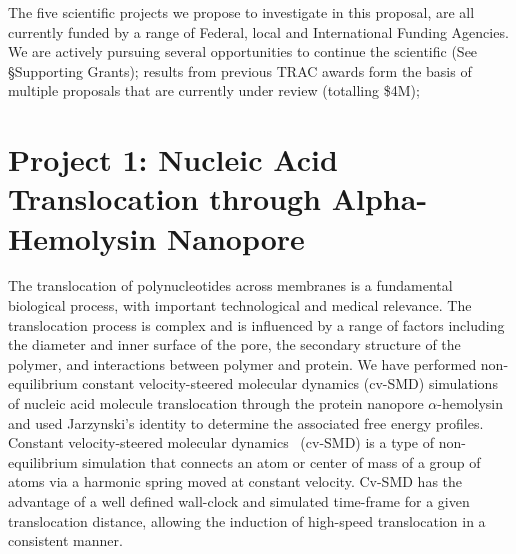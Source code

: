 \documentclass[a4paper,10pt]{article}
\newcommand{\up}{\vspace*{-1em}}
\begin{document}
The five scientific projects we propose to investigate in this proposal, are all currently funded by a range of Federal, local and International Funding Agencies.  We are actively pursuing several opportunities to continue the scientific (See \S Supporting Grants); results from previous TRAC awards form the basis of multiple proposals that are currently under review (totalling \$4M);

\up\up
\section*{Project 1: Nucleic Acid Translocation through Alpha-Hemolysin Nanopore}
\up
The translocation of polynucleotides across membranes is a fundamental biological process, with important technological and medical relevance.  The translocation process is complex and is influenced by a range of factors including the diameter and inner surface of the pore, the secondary structure of the polymer, and interactions between polymer and protein. We have performed non-equilibrium constant velocity-steered molecular dynamics (cv-SMD) simulations of nucleic acid molecule translocation through the protein nanopore $\alpha$-hemolysin and used Jarzynski's identity%
to determine the associated free energy profiles. Constant velocity-steered molecular dynamics~\cite{namd} (cv-SMD) is a type of non-equilibrium simulation that connects an atom or center of mass of a group of atoms via a harmonic spring moved at constant velocity. Cv-SMD has the advantage of a well defined wall-clock and simulated time-frame for a given translocation distance, allowing the induction of high-speed translocation in a consistent manner.
\end{document}
